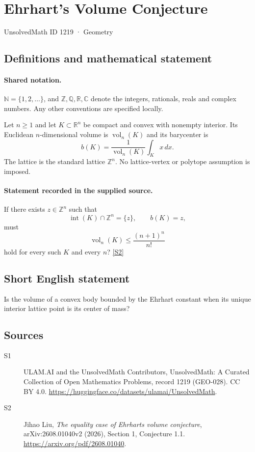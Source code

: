 \documentclass[11pt]{article}
\newcommand{\sref}[2]{\hyperlink{source:#1:#2}{[S#2]}}
\begin{document}
\setcounter{section}{1218}
\section{Ehrhart's Volume Conjecture}\label{1219}
{\small\sffamily UnsolvedMath ID 1219 · Geometry}
\subsection{Definitions and mathematical statement}

\paragraph{Shared notation.}$\mathbb N=\{1,2,\ldots\}$, and $\mathbb Z,\mathbb Q,\mathbb R,\mathbb C$ denote the integers, rationals, reals and complex numbers. Any other conventions are specified locally.


Let $n\geq1$ and let $K\subset\mathbb R^n$ be compact and convex with nonempty interior. Its Euclidean $n$-dimensional volume is $\operatorname{vol}_n(K)$ and its barycenter is
\[
b(K)=\frac{1}{\operatorname{vol}_n(K)}\int_Kx\,dx.
\]
The lattice is the standard lattice $\mathbb Z^n$. No lattice-vertex or polytope assumption is imposed.
\paragraph{Statement recorded in the supplied source.}
If there exists $z\in\mathbb Z^n$ such that
\[
\operatorname{int}(K)\cap\mathbb Z^n=\{z\},\qquad b(K)=z,
\]
must
\[
\operatorname{vol}_n(K)\leq\frac{(n+1)^n}{n!}
\]
hold for every such $K$ and every $n$? \sref{1219}{2}

\subsection{Short English statement}
Is the volume of a convex body bounded by the Ehrhart constant when its unique interior lattice point is its center of mass?
\subsection{Sources}
\begin{description}
\item[\hypertarget{source:1219:1}{S1}] ULAM.AI and the UnsolvedMath Contributors, UnsolvedMath: A Curated Collection of Open Mathematics Problems, record 1219 (GEO-028). CC BY 4.0. \url{https://huggingface.co/datasets/ulamai/UnsolvedMath}.
\item[\hypertarget{source:1219:2}{S2}] Jihao Liu, \emph{The equality case of Ehrhart\textquotesingle s volume conjecture}, arXiv:2608.01040v2 (2026), Section 1, Conjecture 1.1. \url{https://arxiv.org/pdf/2608.01040}.
\end{description}
\label{end:1219}
\end{document}
